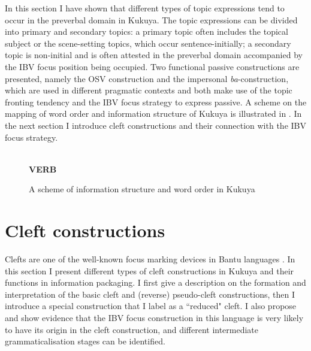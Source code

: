 \documentclass[output=paper,colorlinks,citecolor=brown,
]{langscibook}
\begin{document}
In this section I have shown that different types of topic expressions tend to occur in the preverbal domain in Kukuya. The topic expressions can be divided into primary and secondary topics: a primary topic often includes the topical subject or the scene-setting topics, which occur sentence-initially; a secondary topic is non-initial and is often attested in the preverbal domain accompanied by the IBV focus position being occupied. Two functional passive constructions are presented, namely the OSV construction and the impersonal \textit{ba}-construction, which are used in different pragmatic contexts and both make use of the topic fronting tendency and the IBV focus strategy to express passive. A scheme on the mapping of word order and information structure of Kukuya is illustrated in . In the next section I introduce cleft constructions and their connection with the IBV focus strategy.

\begin{figure}
\caption{A scheme of information structure and word order in Kukuya}
\label{fig:teke:fromex:135}
\fbox
{}
\fbox
{}
    \fbox
{}
\\
\fbox
{}
\textbf{VERB}
\fbox
{}
\end{figure}

\section{Cleft constructions}\label{teke:sec:5}
Clefts are one of the well-known focus marking devices in Bantu languages \citep{Demuth1987, SabelZeller2006, ChengDowning2013, HamlaouiMakasso2015, LafkiouiEtAl2016}. In this section I present different types of cleft constructions in Kukuya and their functions in information packaging. I first give a description on the formation and interpretation of the basic cleft and (reverse) pseudo-cleft constructions, then I introduce a special construction that I label as a ``reduced" cleft. I also propose and show evidence that the IBV focus construction in this language is very likely to have its origin in the cleft construction, and different intermediate grammaticalisation stages can be identified.
\end{document}
